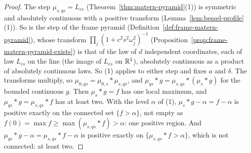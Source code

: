 \begin{proof}
The step $\mu_{s,qs} = L_{cs}$ (Theorem~\ref{thm:matern-pyramid}(1)) is symmetric
and absolutely continuous with a positive transform (Lemma~\ref{lem:bessel-profile}(1)). So is the
step of the frame pyramid (Definition~\ref{def:frame-matern-pyramid}), whose transform
$\prod_j(1 + c^2s^2\omega_j^2)^{-1}$ (Proposition~\ref{prop:frame-matern-pyramid-exists}) is that of
the law of $d$ independent coordinates, each of law $L_{cs}$ on the line (the image of $L_{cs}$ on
$\mathbb{R}^1$), absolutely continuous as a product of absolutely continuous laws. So (1) applies to either
step and fixes $a$ and $\delta$. The transforms multiply, so $\mu_{0,qs} = \mu_{0,s} * \mu_{s,qs}$,
and $\mu_{qs} * g = \mu_{s,qs} * (\mu_s * g)$ for the bounded continuous $g$. Then $\mu_s * g = f$
has one local maximum, and $\mu_{qs} * g = \mu_{s,qs} * f$ has at least two. With the level
$\alpha$ of (1), $\mu_s * g - \alpha = f - \alpha$ is positive exactly on the connected set
$\{f > \alpha\}$, not empty as $f(0) = \max f \ge \max(\mu_{s,qs} * f) > \alpha$: one positive
region. And $\mu_{qs} * g - \alpha = \mu_{s,qs} * f - \alpha$ is positive exactly on
$\{\mu_{s,qs} * f > \alpha\}$, which is not connected: at least two.


\end{proof}
